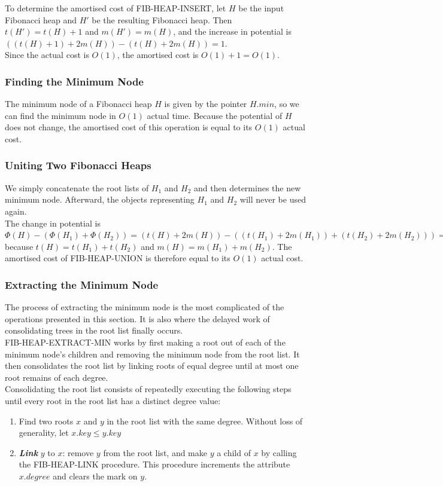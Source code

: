 To determine the amortised cost of FIB-HEAP-INSERT, let $H$ be the input Fibonacci heap and $H'$ be the resulting Fibonacci heap. Then $t(H') = t(H) + 1$ and $m(H') = m(H)$, and the increase in potential is $((t(H) + 1) + 2m(H)) - (t(H) + 2m(H)) = 1$. \\

Since the actual cost is $O(1)$, the amortised cost is $O(1) + 1 = O(1)$.
%
\subsubsection{Finding the Minimum Node}
The minimum node of a Fibonacci heap $H$ is given by the pointer $H.min$, so we can find the minimum node in $O(1)$ actual time. Because the potential of $H$ does not change, the amortised cost of this operation is equal to its $O(1)$ actual cost. 
%
\subsubsection{Uniting Two Fibonacci Heaps}
We simply concatenate the root lists of $H_1$ and $H_2$ and then determines the new minimum node. Afterward, the objects representing $H_1$ and $H_2$ will never be used again. \\

The change in potential is\\ $\Phi(H) - (\Phi(H_1) + \Phi(H_2)) = (t(H) + 2m(H)) - ((t(H_1) + 2m(H_1)) + (t(H_2) + 2m(H_2))) = 0$\\ because $t(H) = t(H_1) + t(H_2)$ and $m(H) = m(H_1) + m(H_2)$. The amortised cost of FIB-HEAP-UNION is therefore equal to its $O(1)$ actual cost. 
%
\subsubsection{Extracting the Minimum Node}
The process of extracting the minimum node is the most complicated of the operations presented in this section. It is also where the delayed work of consolidating trees in the root list finally occurs. \\

FIB-HEAP-EXTRACT-MIN works by first making a root out of each of the minimum node’s children and removing the minimum node from the root list. It then consolidates the root list by linking roots of equal degree until at most one root remains of each degree.\\

Consolidating the root list consists of repeatedly executing the following steps until every root in the root list has a distinct degree value:
\begin{enumerate}
	\item Find two roots $x$ and $y$ in the root list with the same degree. Without loss of generality, let $x.key \leq y.key$
	\item \textbf{\textit{Link}} $y$ to $x$: remove $y$ from the root list, and make $y$ a child of $x$ by calling the FIB-HEAP-LINK procedure. This procedure increments the attribute $x.degree$ and clears the mark on $y$. 
\end{enumerate}

